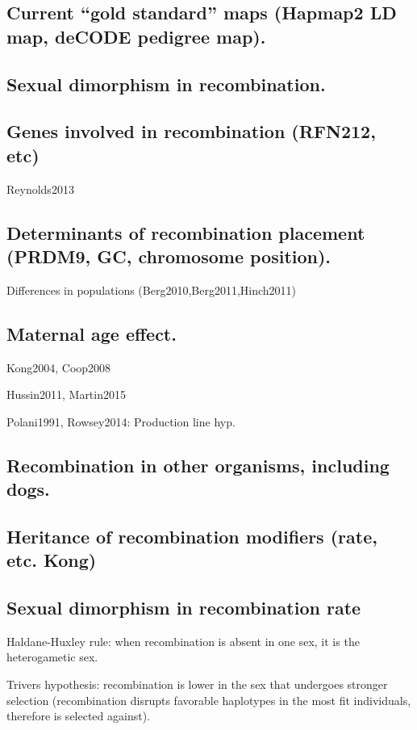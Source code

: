 \subsection{Current ``gold standard'' maps (Hapmap2 LD map, deCODE pedigree map).}
\subsection{Sexual dimorphism in recombination.}
\subsection{Genes involved in recombination (RFN212, etc)}
Reynolds2013

\subsection{Determinants of recombination placement (PRDM9, GC, chromosome position).}

Differences in populations (Berg2010,Berg2011,Hinch2011)

\subsection{Maternal age effect.}

Kong2004, Coop2008

Hussin2011, Martin2015

Polani1991, Rowsey2014: Production line hyp.

\subsection{Recombination in other organisms, including dogs.}
\subsection{Heritance of recombination modifiers (rate, etc. Kong)}
\subsection{Sexual dimorphism in recombination rate}

Haldane-Huxley rule: when recombination is absent in one sex, it is the heterogametic sex.

Trivers hypothesis: recombination is lower in the sex that undergoes stronger selection (recombination disrupts favorable haplotypes in the most fit individuals, therefore is selected against).


